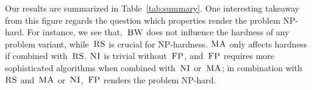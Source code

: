 Our results are summarized in
Table~\ref{tab:summary}.
One interesting takeaway from this figure regards
the question which properties render the problem
NP-hard. For instance, we see that,~$\textsc{BW}$
does not influence the hardness of any problem variant,
while~$\textsc{RS}$ is crucial for NP-hardness.
$\textsc{MA}$ only affects hardness if combined with~$\textsc{RS}$.
$\textsc{NI}$ is trivial without~$\textsc{FP}$, and~$\textsc{FP}$ requires
more sophisticated algorithms when combined with~$\textsc{NI}$ or~$\textsc{MA}$;
in combination with~$\textsc{RS}$ and~$\textsc{MA}$ or~$\textsc{NI}$,~$\textsc{FP}$ renders the
problem NP-hard.
